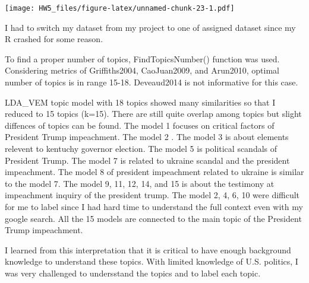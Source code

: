 \documentclass[
]{article}
\begin{document}
\texttt{[image: HW5\_files/figure-latex/unnamed-chunk-23-1.pdf]}

I had to switch my dataset from my project to one of assigned dataset
since my R crashed for some reason.

To find a proper number of topics, FindTopicsNumber() function was used.
Considering metrics of Griffiths2004, CaoJuan2009, and Arun2010, optimal
number of topics is in range 15-18. Deveaud2014 is not informative for
this case.

LDA\_VEM topic model with 18 topics showed many similarities so that I
reduced to 15 topics (k=15). There are still quite overlap among topics
but slight diffences of topics can be found. The model 1 focuses on
critical factors of President Trump impeachment. The model 2 . The model
3 is about elements relevent to kentuchy governor election. The model 5
is political scandals of President Trump. The model 7 is related to
ukraine scandal and the president impeachment. The model 8 of president
impeachment related to ukraine is similar to the model 7. The model 9,
11, 12, 14, and 15 is about the testimony at impeachment inquiry of the
president trump. The model 2, 4, 6, 10 were difficult for me to label
since I had hard time to understand the full context even with my google
search. All the 15 models are connected to the main topic of the
President Trump impeachment.

I learned from this interpretation that it is critical to have enough
background knowledge to understand these topics. With limited knowledge
of U.S. politics, I was very challenged to undersstand the topics and to
label each topic.
\end{document}
